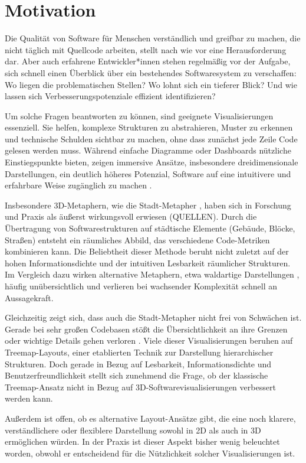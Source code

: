 \section{Motivation} \label{sec:Motivation}
Die Qualität von Software für Menschen verständlich und greifbar zu machen, die nicht täglich mit Quellcode arbeiten, stellt nach wie vor eine Herausforderung dar. Aber auch erfahrene Entwickler*innen stehen regelmäßig vor der Aufgabe, sich schnell einen Überblick über ein bestehendes Softwaresystem zu verschaffen: Wo liegen die problematischen Stellen? Wo lohnt sich ein tieferer Blick? Und wie lassen sich Verbesserungspotenziale effizient identifizieren?

Um solche Fragen beantworten zu können, sind geeignete Visualisierungen essenziell. Sie helfen, komplexe Strukturen zu abstrahieren, Muster zu erkennen und technische Schulden sichtbar zu machen, ohne dass zunächst jede Zeile Code gelesen werden muss. Während einfache Diagramme oder Dashboards nützliche Einstiegspunkte bieten, zeigen immersive Ansätze, insbesondere dreidimensionale Darstellungen, ein deutlich höheres Potenzial, Software auf eine intuitivere und erfahrbare Weise zugänglich zu machen \cite{3dsoftwareMarcus,codeCity1,first_3D_vis,virtualButVisibleMunro}.

Insbesondere 3D-Metaphern, wie die Stadt-Metapher \cite{codeCity1}, haben sich in Forschung und Praxis als äußerst wirkungsvoll erwiesen (QUELLEN). Durch die Übertragung von Softwarestrukturen auf städtische Elemente (Gebäude, Blöcke, Straßen) entsteht ein räumliches Abbild, das verschiedene Code-Metriken kombinieren kann. Die Beliebtheit dieser Methode beruht nicht zuletzt auf der hohen Informationsdichte und der intuitiven Lesbarkeit räumlicher Strukturen. Im Vergleich dazu wirken alternative Metaphern, etwa waldartige Darstellungen \cite{softwareForest}, häufig unübersichtlich und verlieren bei wachsender Komplexität schnell an Aussagekraft.

Gleichzeitig zeigt sich, dass auch die Stadt-Metapher nicht frei von Schwächen ist. Gerade bei sehr großen Codebasen stößt die Übersichtlichkeit an ihre Grenzen oder wichtige Details gehen verloren \cite{lu2008cascaded}. Viele dieser Visualisierungen beruhen auf Treemap-Layouts, einer etablierten Technik zur Darstellung hierarchischer Strukturen. Doch gerade in Bezug auf Lesbarkeit, Informationsdichte und Benutzerfreundlichkeit stellt sich zunehmend die Frage, ob der klassische Treemap-Ansatz nicht in Bezug auf 3D-Softwarevisualisierungen verbessert werden kann.

Außerdem ist offen, ob es alternative Layout-Ansätze gibt, die eine noch klarere, verständlichere oder flexiblere Darstellung sowohl in 2D als auch in 3D ermöglichen würden. In der Praxis ist dieser Aspekt bisher wenig beleuchtet worden, obwohl er entscheidend für die Nützlichkeit solcher Visualisierungen ist.

